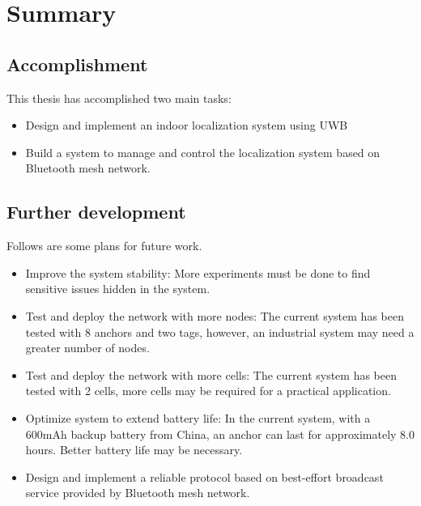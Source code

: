 \documentclass[\main/main.tex]{subfiles}
\begin{document}
\graphicspath{{img/}{summary/img/}}

\chapter{Summary}

\section{Accomplishment}
This thesis has accomplished two main tasks:
\begin{itemize}
    \item Design and implement an indoor localization system using UWB
    \item Build a system to manage and control the localization system based on Bluetooth mesh network.
\end{itemize}

\section{Further development}
Follows are some plans for future work.
\begin{itemize}
    \item Improve the system stability: More experiments must be done to find sensitive issues hidden in the system.
    \item Test and deploy the network with more nodes: The current system has been tested with 8 anchors and two tags, however, an industrial system may need a greater number of nodes.
    \item Test and deploy the network with more cells: The current system has been tested with 2 cells, more cells may be required for a practical application.
    \item Optimize system to extend battery life: In the current system, with a 600mAh backup battery from China, an anchor can last for approximately 8.0 hours. Better battery life may be necessary.
    \item Design and implement a reliable protocol based on best-effort broadcast service provided by Bluetooth mesh network.
\end{itemize}
\end{document}

